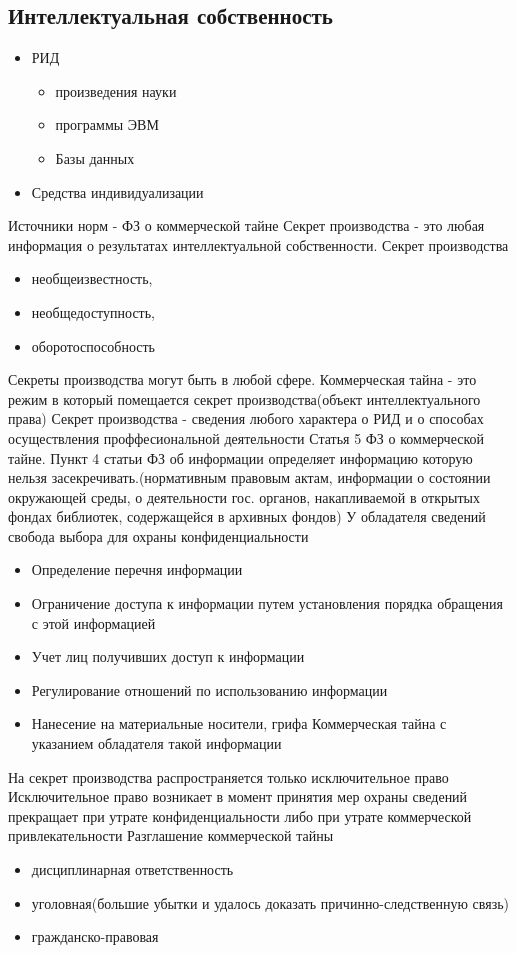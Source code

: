 \documentclass[12pt]{article}
\begin{document}
\subsection{Интеллектуальная собственность}
\begin{itemize}
    \item РИД \begin{itemize}
        \item произведения науки
        \item программы ЭВМ
        \item Базы данных
    \end{itemize}
    \item Средства индивидуализации
\end{itemize}
Источники норм -  ФЗ о коммерческой тайне
Секрет производства - это любая информация о результатах интеллектуальной собственности.
Секрет производства \begin{itemize}
    \item необщеизвестность,
    \item необщедоступность,
    \item оборотоспособность
\end{itemize}  
Секреты производства могут быть в любой сфере. 
Коммерческая тайна - это режим в который помещается секрет производства(объект интеллектуального права)
Секрет производства - сведения любого характера о РИД и о способах осуществления проффесиональной деятельности
Статья 5 ФЗ о коммерческой тайне. Пункт 4 статьи ФЗ об информации определяет информацию которую нельзя засекречивать.(нормативным правовым актам, информации о состоянии окружающей среды, о деятельности гос. органов, накапливаемой в открытых фондах библиотек, содержащейся в архивных фондов)
У обладателя сведений свобода выбора для охраны конфиденциальности 
\begin{itemize}
    \item Определение перечня информации
    \item Ограничение доступа к информации путем установления порядка обращения с этой информацией
    \item Учет лиц получивших доступ к информации
    \item Регулирование отношений по использованию информации
    \item Нанесение на материальные носители, грифа Коммерческая тайна с указанием обладателя такой информации
\end{itemize}
На секрет производства распространяется только исключительное право
Исключительное право возникает в момент принятия мер охраны сведений прекращает при утрате конфиденциальности либо при утрате коммерческой привлекательности
Разглашение коммерческой тайны \begin{itemize}
    \item дисциплинарная ответственность
    \item уголовная(большие убытки и удалось доказать причинно-следственную связь)
    \item гражданско-правовая
\end{itemize}
\end{document}
